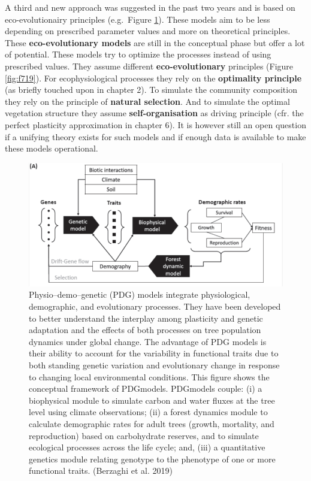 \documentclass[12pt,oneside]{book}
\begin{document}
A third and new approach was suggested in the past two years and is
based on eco-evolutionairy principles (e.g.~Figure \ref{fig:f718}).
These models aim to be less depending on prescribed parameter values and
more on theoretical principles. These \textbf{eco-evolutionary models}
are still in the conceptual phase but offer a lot of potential. These
models try to optimize the processes instead of using prescribed values.
They assume different \textbf{eco-evolutionary} principles (Figure
\ref{fig:f719}). For ecophysiological processes they rely on the
\textbf{optimality principle} (as briefly touched upon in chapter 2). To
simulate the community composition they rely on the principle of
\textbf{natural selection}. And to simulate the optimal vegetation
structure they assume \textbf{self-organisation} as driving principle
(cfr. the perfect plasticity approximation in chapter 6). It is however
still an open question if a unifying theory exists for such models and
if enough data is available to make these models operational.

\begin{figure}

{\centering \includegraphics[width=0.8\linewidth]{figures/chap7/f718_berzaghi} 

}

\caption{Physio–demo–genetic (PDG) models integrate physiological, demographic, and evolutionary processes. They have been developed to better understand the interplay among plasticity and genetic adaptation and the effects of both processes on tree population dynamics under global change. The advantage of PDG models is their ability to account for the variability in functional traits due to both standing genetic variation and evolutionary change in response to changing local environmental conditions. This figure shows the conceptual framework of PDGmodels. PDGmodels couple: (i) a biophysical module to simulate carbon and water fluxes at the tree level using climate observations; (ii) a forest dynamics module to calculate demographic rates for adult trees (growth, mortality, and reproduction) based on carbohydrate reserves, and to simulate ecological processes across the life cycle; and, (iii) a quantitative genetics module relating genotype to the phenotype of one or more functional traits. (Berzaghi et al. 2019)}\label{fig:f718}
\end{figure}
\end{document}
